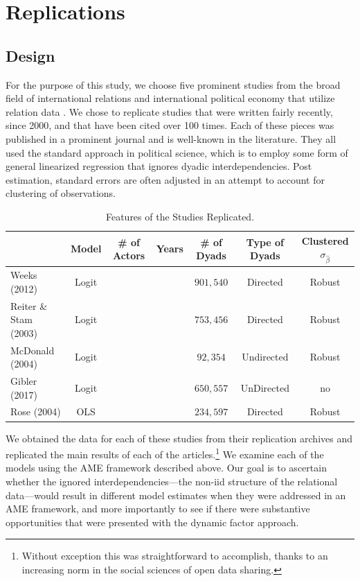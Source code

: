 \section{Replications}
 
\subsection{Design}

For the purpose of this study, we choose five prominent studies from the broad field of international relations and international political economy that utilize relation data \citep{mcdonald:2004, reiter:stam:2003, rose:2004, weeks:2012, gibler:2017}. We chose to replicate studies that were written fairly recently, since 2000, and that have been cited over 100 times. Each of these pieces was published in a prominent journal and is well-known in the literature. They all used the standard approach in political science, which is to employ some form of general linearized regression that ignores dyadic interdependencies. Post estimation, standard errors are often adjusted in an attempt to account for clustering of observations.

\begin{table}
\caption{Features of the Studies Replicated. }
	\begin{tabular}{lcccccc}
		 & Model & \# of Actors & Years  & \# of Dyads & Type of Dyads & Clustered $\sigma_{\hat{\beta}}$ \\ \hline\hline
		Weeks (2012) & Logit & & & $901,540$ & Directed & Robust \\
		Reiter \& Stam (2003) & Logit & & & $753,456$ & Directed & Robust \\
		McDonald (2004) & Logit & & & $92,354$ & Undirected & Robust\\		
		Gibler (2017) & Logit & & & $650,557$ & UnDirected & no \\		
		Rose (2004) & OLS & & & $234,597$ & Directed & Robust \\
	\hline\hline
	\end{tabular}
\end{table}

We obtained the data for each of these studies from their replication archives and replicated the main results of each of the articles.\footnote{Without exception this was straightforward to accomplish, thanks to an increasing norm in the social sciences of open data sharing.} We examine each of the models using the AME framework described above.  Our goal is to ascertain whether the ignored interdependencies---the non-iid structure of the relational data---would result in different model estimates when they were addressed in an AME framework, and more importantly to see if there were substantive opportunities that were presented with the dynamic factor approach.  

